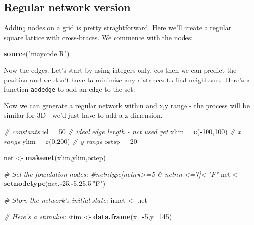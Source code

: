 \documentclass[]{article}
\newenvironment{Shaded}{\begin{snugshade}}{\end{snugshade}}
\newcommand{\CommentTok}[1]{\textcolor[rgb]{0.56,0.35,0.01}{\textit{#1}}}
\newcommand{\DataTypeTok}[1]{\textcolor[rgb]{0.13,0.29,0.53}{#1}}
\newcommand{\DecValTok}[1]{\textcolor[rgb]{0.00,0.00,0.81}{#1}}
\newcommand{\KeywordTok}[1]{\textcolor[rgb]{0.13,0.29,0.53}{\textbf{#1}}}
\newcommand{\NormalTok}[1]{#1}
\newcommand{\OperatorTok}[1]{\textcolor[rgb]{0.81,0.36,0.00}{\textbf{#1}}}
\newcommand{\StringTok}[1]{\textcolor[rgb]{0.31,0.60,0.02}{#1}}
\begin{document}
\hypertarget{regular-network-version}{%
\subsection{Regular network version}\label{regular-network-version}}

Adding nodes on a grid is pretty straghtforward. Here we'll create a
regular square lattice with cross-braces. We commence with the nodes:

\begin{Shaded}
\begin{Highlighting}[]
\KeywordTok{source}\NormalTok{(}\StringTok{"maycode.R"}\NormalTok{)}
\end{Highlighting}
\end{Shaded}

Now the edges. Let's start by using integers only, cos then we can
predict the position and we don't have to minimise any distances to find
neighbours. Here's a function \texttt{addedge} to add an edge to the
set:

Now we can generate a regular network within and x,y range - the process
will be similar for 3D - we'd just have to add a z dimension.

\begin{Shaded}
\begin{Highlighting}[]
\CommentTok{# constants}
\NormalTok{iel =}\StringTok{ }\DecValTok{50}            \CommentTok{# ideal edge length - not used yet}
\NormalTok{xlim =}\StringTok{ }\KeywordTok{c}\NormalTok{(}\OperatorTok{-}\DecValTok{100}\NormalTok{,}\DecValTok{100}\NormalTok{)  }\CommentTok{# x range}
\NormalTok{ylim =}\StringTok{ }\KeywordTok{c}\NormalTok{(}\DecValTok{0}\NormalTok{,}\DecValTok{200}\NormalTok{)     }\CommentTok{# y range}
\NormalTok{ostep =}\StringTok{ }\DecValTok{20}

\NormalTok{net <-}\StringTok{ }\KeywordTok{makenet}\NormalTok{(xlim,ylim,ostep)}

\CommentTok{# Set the foundation nodes: }
\CommentTok{#net$n$type[net$n$n>=5 & net$n$n <=7]<-"F"}
\NormalTok{net <-}\StringTok{ }\KeywordTok{setnodetype}\NormalTok{(net,}\OperatorTok{-}\DecValTok{25}\NormalTok{,}\OperatorTok{-}\DecValTok{5}\NormalTok{,}\DecValTok{25}\NormalTok{,}\DecValTok{5}\NormalTok{,}\StringTok{"F"}\NormalTok{)}
 
\CommentTok{# Store the network's initial state:}
\NormalTok{innet <-}\StringTok{ }\NormalTok{net}

\CommentTok{# Here's a stimulus: }
\NormalTok{stim <-}\StringTok{ }\KeywordTok{data.frame}\NormalTok{(}\DataTypeTok{x=}\OperatorTok{-}\DecValTok{5}\NormalTok{,}\DataTypeTok{y=}\DecValTok{145}\NormalTok{)}
\end{Highlighting}
\end{Shaded}
\end{document}

